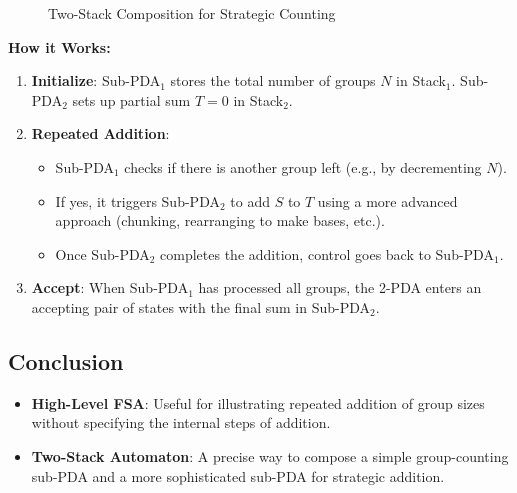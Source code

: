 \documentclass[11pt]{article}
\begin{document}
\begin{figure}[H]
\centering
{}
\caption{Two-Stack Composition for Strategic Counting}
\end{figure}

\textbf{How it Works:}
\begin{enumerate}
    \item \textbf{Initialize}: Sub-PDA\(_1\) stores the total number of groups \(N\) in Stack\(_1\). Sub-PDA\(_2\) sets up partial sum \(T=0\) in Stack\(_2\).
    \item \textbf{Repeated Addition}: 
        \begin{itemize}
            \item Sub-PDA\(_1\) checks if there is another group left (e.g., by decrementing \(N\)). 
            \item If yes, it triggers Sub-PDA\(_2\) to add \(S\) to \(T\) using a more advanced approach (chunking, rearranging to make bases, etc.).
            \item Once Sub-PDA\(_2\) completes the addition, control goes back to Sub-PDA\(_1\).
        \end{itemize}
    \item \textbf{Accept}: When Sub-PDA\(_1\) has processed all groups, the 2-PDA enters an accepting pair of states with the final sum in Sub-PDA\(_2\).
\end{enumerate}

\subsection*{Conclusion}

\begin{itemize}
    \item \textbf{High-Level FSA}: Useful for illustrating repeated addition of group sizes without specifying the internal steps of addition. 
    \item \textbf{Two-Stack Automaton}: A precise way to compose a simple group-counting sub-PDA and a more sophisticated sub-PDA for strategic addition.
\end{itemize}

\printbibliography
\end{document}
